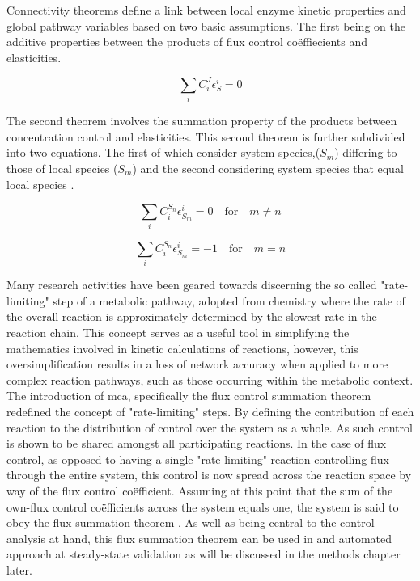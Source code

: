 Connectivity theorems define a link between local enzyme kinetic properties and global pathway variables based on two basic assumptions. The first being on the additive properties between the products of flux control co\"effiecients and elasticities.

\begin{equation}
\sum_{i}C_{i}^J\epsilon_S^i=0
\end{equation}

The second theorem involves the summation property of the products between concentration control and elasticities. This second theorem is further subdivided into two equations. The first of which consider system species,($S_m$) differing to those of local species ($S_m$) and the second considering system species that equal local species \citep{Kacser1979, Westerhoff1984}.

\begin{equation}
\sum_{i}C_{i}^{S_n}\epsilon_{S_m}^i=0\quad \textrm{for}\quad m\ne n
\end{equation}

\begin{equation}
\sum_{i}C_{i}^{S_n}\epsilon_{S_m}^i=-1\quad \textrm{for}\quad m = n
\end{equation}


Many research activities have been geared towards discerning the so called "rate-limiting" step of a metabolic pathway, adopted from chemistry where the rate of the overall reaction is approximately determined by the slowest rate in the reaction chain. This concept serves as a useful tool in simplifying the mathematics involved in kinetic calculations of reactions, however, this oversimplification results in a loss of network accuracy when applied to more complex reaction pathways, such as those occurring within the metabolic context. The introduction of \gls{mca}, specifically the flux control summation theorem redefined the concept of "rate-limiting" steps. By defining the contribution of each reaction to the distribution of control over the system as a whole. As such control is shown to be shared amongst all participating reactions. In the case of flux control, as opposed to having a single "rate-limiting" reaction controlling flux through the entire system, this control is now spread across the reaction space by way of the flux control co\"efficient. Assuming at this point that the sum of the own-flux control co\"efficients across the system equals one, the system is said to obey the flux summation theorem \citep{Fell1992,Hofmeyr2001,Kacser1995,Ehlde1997}. As well as being central to the control analysis at hand, this flux summation theorem can be used in and automated approach at \gls{steady-state} validation as will be discussed in the methods chapter later.

